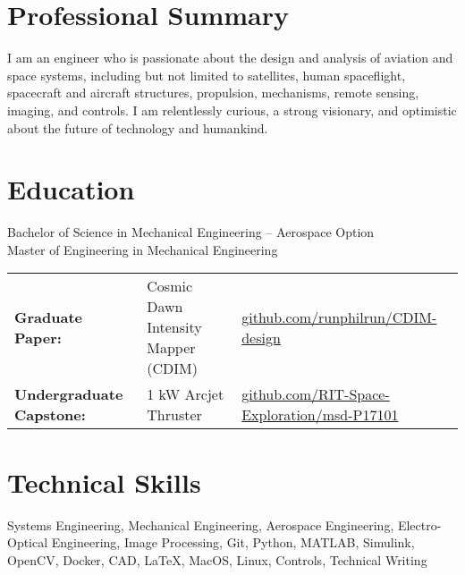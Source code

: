 \documentclass[10pt,final,sans]{resume}
\begin{document}
\setlength\headheight{28pt} %
 

\section{Professional Summary}
I am an engineer who is passionate about the design and analysis of aviation and
space systems, including but not limited to satellites, human spaceflight,
spacecraft and aircraft structures, propulsion, mechanisms, remote sensing,
imaging, and controls. I am relentlessly curious, a strong visionary, and
optimistic about the future of technology and humankind.

\section{Education}
Bachelor of Science in Mechanical Engineering -- Aerospace Option \\
Master of Engineering in Mechanical Engineering \\
\begin{tabular}{@{}lll@{}}
{\bf Graduate Paper:} & Cosmic Dawn Intensity Mapper (CDIM) &
\href{https://github.com/runphilrun/CDIM-design/blob/master/cdim_design.pdf}{github.com/runphilrun/CDIM-design} \\
{\bf Undergraduate Capstone:} & 1 kW Arcjet Thruster &
\href{https://github.com/RIT-Space-Exploration/msd-P17101/blob/master/p17101.pdf}{github.com/RIT-Space-Exploration/msd-P17101}
\end{tabular}

\section{Technical Skills}
Systems Engineering, Mechanical Engineering, Aerospace Engineering,
Electro-Optical Engineering, Image Processing, Git, Python, MATLAB, Simulink,
OpenCV, Docker, CAD, {\textrm \LaTeX}, MacOS, Linux, Controls, Technical Writing
\end{document}
